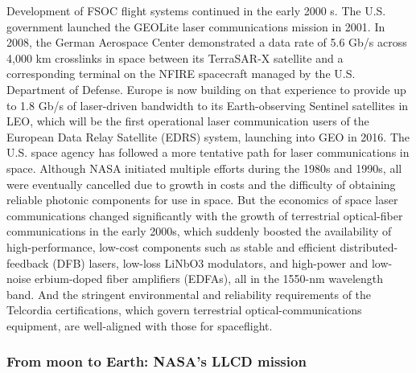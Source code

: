 Development of FSOC flight systems continued in the early 2000 s. The U.S. government launched the GEOLite laser communications mission in 2001. In 2008, the German Aerospace Center demonstrated a data rate of 5.6 Gb/s across 4,000 km crosslinks in space between its TerraSAR-X satellite and a corresponding terminal on the NFIRE spacecraft managed by the U.S. Department of Defense. Europe is now building on that experience to provide up to 1.8 Gb/s of laser-driven bandwidth to its Earth-observing Sentinel satellites in LEO, which will be the first operational laser communication users of the European Data Relay Satellite (EDRS) system, launching into GEO in 2016.
The U.S. space agency has followed a more tentative path for laser communications in space. Although NASA initiated multiple efforts during the 1980s and 1990s, all were eventually cancelled due to growth in costs and the difficulty of obtaining reliable photonic components for use in space. But the economics of space laser communications changed significantly with the growth of terrestrial optical-fiber communications in the early 2000s, which suddenly boosted the availability of high-performance, low-cost components such as stable and efficient distributed-feedback (DFB) lasers, low-loss LiNbO3 modulators, and high-power and low-noise erbium-doped fiber amplifiers (EDFAs), all in the 1550-nm wavelength band. And the stringent environmental and reliability requirements of the Telcordia certifications, which govern terrestrial optical-communications equipment, are well-aligned with those for spaceflight.

\subsubsection{From moon to Earth: NASA’s LLCD mission}

